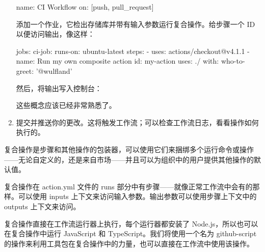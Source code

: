 \begin{enumerate}
\begin{shell}
name: CI Workflow
on: [push, pull_request]
\end{shell}

添加一个作业，它检出存储库并带有输入参数运行复合操作。给步骤一个 ID 以便访问输出，像这样：

\begin{shell}
jobs:
  ci-job:
    runs-on: ubuntu-latest
    steps:
      - uses: actions/checkout@v4.1.1
      - name: Run my own composite action
        id: my-action
        uses: ./
        with:
          who-to-greet: '@wulfland'
\end{shell}

然后，将输出写入控制台：


这些概念应该已经非常熟悉了。

\item 
提交并推送你的更改。这将触发工作流；可以检查工作流日志，看看操作如何执行的。
\end{enumerate}


复合操作是步骤和其他操作的包装器，可以使用它们来捆绑多个运行命令或操作——无论自定义的，还是来自市场——并且可以为组织中的用户提供其他操作的默认值。

复合操作在 action.yml 文件的 runs 部分中有步骤——就像正常工作流中会有的那样。可以使用 inputs 上下文来访问输入参数。输出参数可以使用步骤上下文中的 outputs 上下文来访问。


复合操作直接在工作流运行器上执行，每个运行器都安装了 Node.js，所以也可以在复合操作中运行 JavaScript 和 TypeScript。我们将使用一个名为 github-script 的操作来利用工具包在复合操作中的力量，也可以直接在工作流中使用该操作。